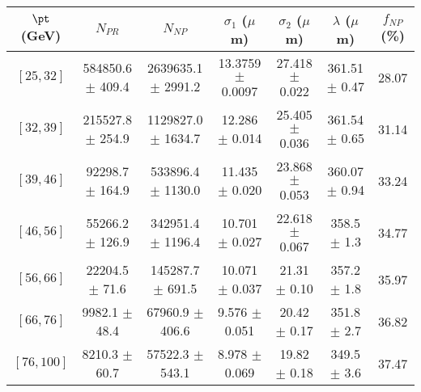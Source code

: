 \begin{tabular}{c||c|c|c|c|c||c}
$\pt$ (GeV) & $N_{PR}$ & $N_{NP}$ & $\sigma_1$ ($\mu$m) & $\sigma_2$ ($\mu$m)  & $\lambda$ ($\mu$m) & $f_{NP}$ (\%) \\
\hline
$[25, 32]$ & 584850.6 $\pm$ 409.4 & 2639635.1 $\pm$ 2991.2 & 13.3759 $\pm$ 0.0097 & 27.418 $\pm$ 0.022 & 361.51 $\pm$ 0.47 & 28.07\\
$[32, 39]$ & 215527.8 $\pm$ 254.9 & 1129827.0 $\pm$ 1634.7 & 12.286 $\pm$ 0.014 & 25.405 $\pm$ 0.036 & 361.54 $\pm$ 0.65 & 31.14\\
$[39, 46]$ & 92298.7 $\pm$ 164.9 & 533896.4 $\pm$ 1130.0 & 11.435 $\pm$ 0.020 & 23.868 $\pm$ 0.053 & 360.07 $\pm$ 0.94 & 33.24\\
$[46, 56]$ & 55266.2 $\pm$ 126.9 & 342951.4 $\pm$ 1196.4 & 10.701 $\pm$ 0.027 & 22.618 $\pm$ 0.067 & 358.5 $\pm$ 1.3 & 34.77\\
$[56, 66]$ & 22204.5 $\pm$ 71.6 & 145287.7 $\pm$ 691.5 & 10.071 $\pm$ 0.037 & 21.31 $\pm$ 0.10 & 357.2 $\pm$ 1.8 & 35.97\\
$[66, 76]$ & 9982.1 $\pm$ 48.4 & 67960.9 $\pm$ 406.6 & 9.576 $\pm$ 0.051 & 20.42 $\pm$ 0.17 & 351.8 $\pm$ 2.7 & 36.82\\
$[76, 100]$ & 8210.3 $\pm$ 60.7 & 57522.3 $\pm$ 543.1 & 8.978 $\pm$ 0.069 & 19.82 $\pm$ 0.18 & 349.5 $\pm$ 3.6 & 37.47\\
\end{tabular}
